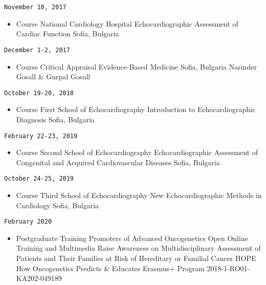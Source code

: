 \documentclass[
  12pt,
  letterpaper,
  DIV=11,
  numbers=noendperiod]{scrartcl}
\providecommand{\tightlist}{%
  \setlength{\itemsep}{0pt}\setlength{\parskip}{0pt}}\usepackage{longtable,booktabs,array}
\begin{document}
\texttt{November\ 10,\ 2017}

\begin{itemize}
\tightlist
\item
  Course \textbar{} National Cardiology Hospital \textbar{}
  Echocardiographic Assessment of Cardiac Function \textbar{} Sofia,
  Bulgaria
\end{itemize}

\texttt{December\ 1-2,\ 2017}

\begin{itemize}
\tightlist
\item
  Course \textbar{} Critical Appraisal \textbar{} Evidence-Based
  Medicine \textbar{} Sofia, Bulgaria \textbar{} Narinder Gosall \&
  Gurpal Gosall
\end{itemize}

\texttt{October\ 19-20,\ 2018}

\begin{itemize}
\tightlist
\item
  Course \textbar{} First School of Echocardiography \textbar{}
  Introduction to Echocardiographic Diagnosis \textbar{} Sofia, Bulgaria
\end{itemize}

\texttt{February\ 22-23,\ 2019}

\begin{itemize}
\tightlist
\item
  Course \textbar{} Second School of Echocardiography \textbar{}
  Echocardiographic Assessment of Congenital and Acquired Cardiovascular
  Diseases \textbar{} Sofia, Bulgaria
\end{itemize}

\texttt{October\ 24-25,\ 2019}

\begin{itemize}
\tightlist
\item
  Course \textbar{} Third School of Echocardiography \textbar{} New
  Echocardiographic Methods in Cardiology \textbar{} Sofia, Bulgaria
\end{itemize}

\texttt{February\ 2020}

\begin{itemize}
\tightlist
\item
  Postgraduate Training \textbar{} Promoters of Advanced Oncogenetics
  \textbar{} Open Online Training and Multimedia Raise Awareness on
  Multidisciplinary Assessment of Patients and Their Families at Risk of
  Hereditary or Familial Cancer \textbar{} HOPE How Oncogenetics
  Predicts \& Educates Erasmus+ Program 2018-1-RO01-KA202-049189
\end{itemize}
\end{document}
